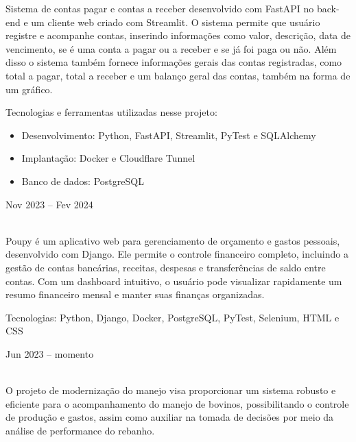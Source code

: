 \documentclass{cv}
\begin{document}
Sistema de contas pagar e contas a receber desenvolvido com FastAPI
no back-end e um cliente web criado com Streamlit. O sistema permite
que usuário registre e acompanhe contas, inserindo informações como
valor, descrição, data de vencimento, se é uma conta a pagar ou a
receber e se já foi paga ou não. Além disso o sistema também fornece
informações gerais das contas registradas, como total a pagar, total
a receber e um balanço geral das contas, também na forma de um gráfico.

\vspace{0.08cm}

Tecnologias e ferramentas utilizadas nesse projeto:

\begin{itemize}
  \item Desenvolvimento: Python, FastAPI, Streamlit, PyTest e SQLAlchemy
  \item Implantação: Docker e Cloudflare Tunnel
  \item Banco de dados: PostgreSQL
\end{itemize}

\hfill{Nov 2023 -- Fev 2024}\\
\\
\vspace{0.15cm}

Poupy é um aplicativo web para gerenciamento de orçamento e gastos pessoais,
desenvolvido com Django. Ele permite o controle financeiro completo, incluindo
a gestão de contas bancárias, receitas, despesas e transferências de saldo entre
contas. Com um dashboard intuitivo, o usuário pode visualizar rapidamente um
resumo financeiro mensal e manter suas finanças organizadas.

\vspace{0.08cm}

Tecnologias: Python, Django, Docker, PostgreSQL, PyTest, Selenium, HTML e CSS

\hfill{Jun 2023 -- momento}\\
\\
\vspace{0.15cm}

O projeto de modernização do manejo visa proporcionar um sistema robusto e eficiente
para o acompanhamento do manejo de bovinos, possibilitando o controle de produção
e gastos, assim como auxiliar na tomada de decisões por meio da análise de performance do rebanho.
\end{document}
